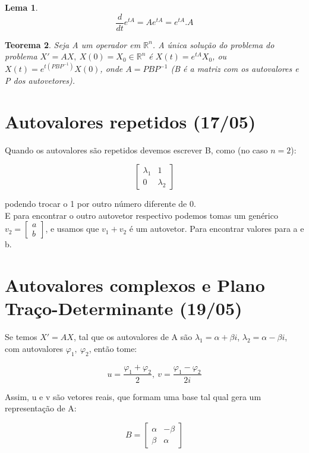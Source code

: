 \documentclass[12pt]{article}
\newtheorem{theorem}{Teorema}[section]
\newtheorem{lemma}[theorem]{Lema}
\begin{document}
\begin{lemma}
    $$\dfrac{d}{d t} e^{t A} = A e^{t A} = e^{t A} . A$$
\end{lemma}

\begin{theorem}
    Seja A um operador em $\mathbb{R}^n$. A única solução do problema do problema $X' = A X, \ X(0) = X_0 \in \mathbb{R}^n$ é $X(t) = e^{tA} X_0$, ou $X(t) = e^{t (P B P^{-1})} X(0)$, onde $A = P B P^{-1}$ (B é a matriz com os autovalores e P dos autovetores).
\end{theorem}

\section{Autovalores repetidos (17/05)}
Quando os autovalores são repetidos devemos escrever B, como (no caso $n = 2$):

$$
\left [
\begin{array}{cc}
    \lambda_1 & 1 \\
    0 & \lambda_2
\end{array}
\right ]
$$

podendo trocar o 1 por outro número diferente de 0.\\

E para encontrar o outro autovetor respectivo podemos tomas um genérico $v_2 = \left [ \begin{array}{c}
     a \\
     b
\end{array}
\right ]$, e usamos que $v_1 + v_2$ é um autovetor. Para encontrar valores para a e b.

\section{Autovalores complexos e Plano Traço-Determinante (19/05)}
Se temos $X' = AX$, tal que os autovalores de A são $\lambda_1 = \alpha + \beta i$, $\lambda_2 = \alpha - \beta i$, com autovalores $\varphi_1, \ \varphi_2$, então tome:

$$u = \frac{\varphi_1 + \varphi_2}{2}, \ v = \frac{\varphi_1 - \varphi_2}{2 i}$$

Assim, u e v são vetores reais, que formam uma base tal qual gera um representação de A:

$$B = \left [ \begin{array}{cc}
    \alpha & - \beta \\
    \beta & \alpha 
\end{array} \right ]$$
\end{document}
